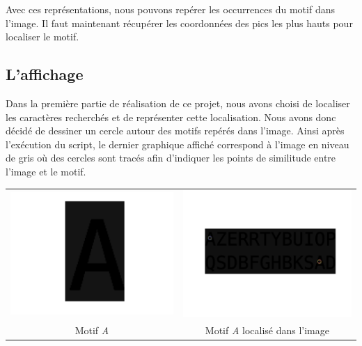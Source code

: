 \documentclass[a4paper,12pt,titlepage]{report}
\begin{document}
	Avec ces représentations, nous pouvons repérer les occurrences du motif dans l'image. Il faut maintenant récupérer les coordonnées des pics les plus hauts pour localiser le motif.
	\subsection{L'affichage}
	Dans la première partie de réalisation de ce projet, nous avons choisi de localiser les caractères recherchés et de représenter cette localisation. Nous avons donc décidé de dessiner un cercle autour des motifs repérés dans l'image.
	Ainsi après l'exécution du script, le dernier graphique affiché correspond à l'image en niveau de gris où des cercles sont tracés afin d'indiquer les points de similitude entre l'image et le motif.
	
	\begin{center}
		\begin{tabular}{cc}
				\includegraphics[scale=0.15]{illus/motifm0.png} & \includegraphics[scale=0.22]{illus/motiflocal.png}\\
				Motif \textit{A}  & Motif \textit{A} localisé dans l'image \\
		\end{tabular}	
	\end{center}
\end{document}
